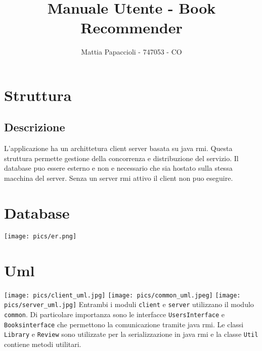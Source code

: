 \documentclass{report}
\title{Manuale Utente - Book Recommender}
\author{Mattia Papaccioli - 747053 - CO}
\begin{document}
\maketitle

\tableofcontents


\chapter{Struttura}
\section{Descrizione}
L'applicazione ha un archittetura client server basata su java rmi. Questa struttura permette gestione della concorrenza e distribuzione del servizio. Il database puo essere esterno e non e necessario che sia hostato sulla stessa macchina del server. Senza un server rmi attivo il client non puo eseguire.

\chapter{Database}
\texttt{[image: pics/er.png]} 

\chapter{Uml}
\texttt{[image: pics/client\_uml.jpg]}
\texttt{[image: pics/common\_uml.jpeg]} 
\texttt{[image: pics/server\_uml.jpg]} 
Entrambi i moduli \verb+client+ e \verb+server+ utilizzano il modulo \verb+common+. Di particolare importanza sono le interfacce \verb+UsersInterface+ e \verb+Booksinterface+ che permettono la comunicazione tramite java rmi. Le classi \verb+Library+ e \verb+Review+ sono utilizzate per la serializzazione in java rmi e la classe \verb+Util+ contiene metodi utilitari.
\end{document}

